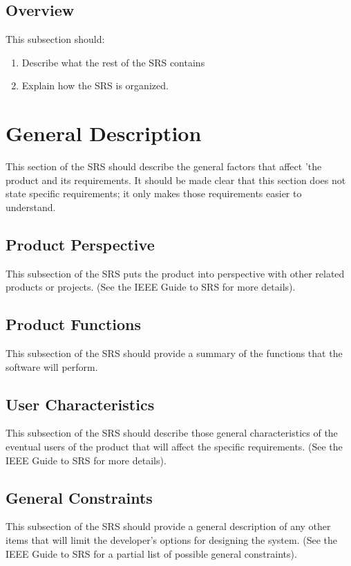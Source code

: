 \documentclass[titlepage]{article}
\begin{document}
\subsection{Overview}
This subsection should:
\begin{enumerate}
	\item Describe what the rest of the SRS contains
	\item Explain how the SRS is organized.
\end{enumerate}

\section{General Description}
This section of the SRS should describe the general factors that affect 'the product and its requirements.  It should be made clear that this section does not state specific requirements; it only makes those requirements easier to understand.

\subsection{Product Perspective}
This subsection of the SRS puts the product into perspective with other related products or
projects.  (See the IEEE Guide to SRS for more details).

\subsection{Product Functions}
This subsection of the SRS should provide a summary of the functions that the software will perform. 

\subsection{User Characteristics}
This subsection of the SRS should describe those general characteristics of the eventual users of the product that will affect the specific requirements.  (See the IEEE Guide to SRS for more details).

\subsection{General Constraints}
This subsection of the SRS should provide a general description of any other items that will
limit the developer’s options for designing the system. (See the IEEE Guide to SRS for a partial list of possible general constraints).
\end{document}

